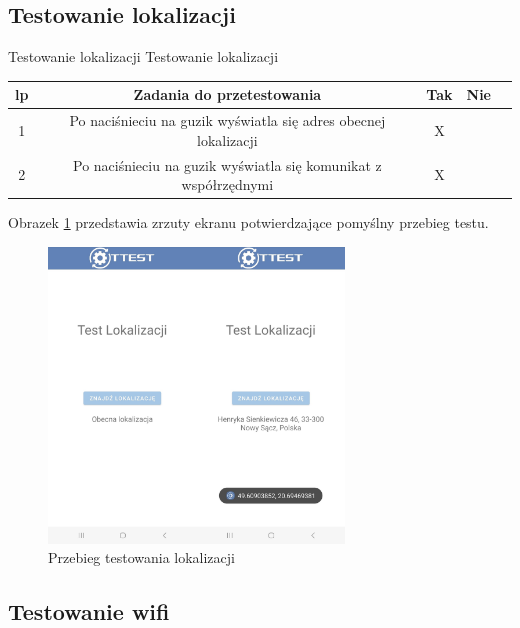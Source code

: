\subsection{Testowanie lokalizacji}

\begin{tabela}
	{Testowanie lokalizacji}	%
	{Testowanie lokalizacji}	%
	{
		\begin{tabular}{|c|c|c|c|c|} \hline
			\textbf{lp} & \textbf{Zadania do przetestowania} & \textbf{Tak} & \textbf{Nie} \\ \hline
			1 & Po naciśnieciu na guzik wyświatla się adres obecnej lokalizacji  & X & ~ \\ \hline
			2 & Po naciśnieciu na guzik wyświatla się komunikat z współrzędnymi & X & ~ \\ \hline
	\end{tabular}	}
	\label{tab:tablica_gps}
\end{tabela}

Obrazek \ref{rys:gps} przedstawia zrzuty ekranu potwierdzające pomyślny przebieg testu.

\begin{figure}[!hbt]
	\begin{center}
		\includegraphics[angle=360, width=0.70\textwidth]{rys/punkt5/gps.jpg}
		\caption{Przebieg testowania lokalizacji}
		\label{rys:gps}
	\end{center}
\end{figure} 

\newpage


\subsection{Testowanie wifi}  

